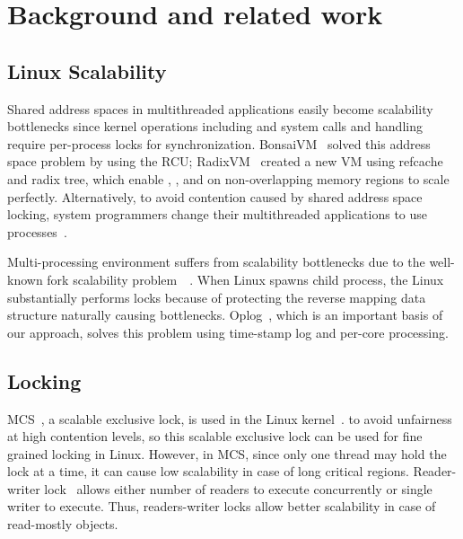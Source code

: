 \section{Background and related work} \label{sec:Background}
\subsection{Linux Scalability}

Shared address spaces in multithreaded applications 
easily become scalability bottlenecks since kernel operations 
including  and  system calls and  handling
require per-process locks for synchronization.
BonsaiVM~\cite{AustinTClements2012RCUBalancedTrees} solved this address space
problem by using the RCU;
RadixVM~\cite{Clements2013RadixVM} created a new VM using refcache and radix
tree, which enable , , and  on
non-overlapping memory regions to scale perfectly.
Alternatively, to avoid contention caused by shared address space locking,
system programmers change their multithreaded applications to use
processes~\cite{SilasBoydWickizer2010LinuxScales48}.
 
Multi-processing environment 
suffers from scalability bottlenecks due to the well-known fork
scalability problem~\cite{Andi2011adding}~\cite{Tim2013adding}.
When Linux spawns child process, the Linux substantially performs locks because
of protecting the reverse mapping data structure naturally causing
bottlenecks.
Oplog~\cite{SilasBoydWickizerPth}, which is an important basis of our approach,
solves this problem using time-stamp log and
per-core processing.


\subsection{Locking}
MCS~\cite{MellorCrummey91}, a scalable exclusive lock, is used in the Linux
kernel~\cite{MCSLocksKernel}.
to avoid unfairness at high contention levels, so this scalable exclusive
lock can be used for fine grained locking in Linux. 
However, in MCS, since only one thread may hold the lock at a time, it can
cause low scalability in case of long critical regions.
Reader-writer lock~\cite{Courtois71} allows either number of readers to execute
concurrently or single writer to execute.
Thus, readers-writer locks allow better scalability in case of read-mostly 
objects.

